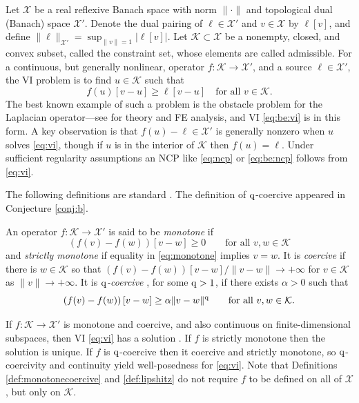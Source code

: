 \documentclass[hidelinks,onefignum,onetabnum,final]{siamart220329}  %
\newcommand{\cK}{\mathcal{K}}
\newcommand{\cX}{\mathcal{X}}
\newcommand{\qq}{{\text{\textnormal{q}}}}
\begin{document}
Let $\cX$ be a real reflexive Banach space with norm $\|\cdot\|$ and topological dual (Banach) space $\cX'$.  Denote the dual pairing of $\ell \in \cX'$ and $v\in\cX$ by $\ell[v]$, and define $\|\ell\|_{\cX'} = \sup_{\|v\|=1} \big|\ell[v]\big|$.  Let $\cK \subset \cX$ be a nonempty, closed, and convex subset, called the constraint set, whose elements are called admissible.  For a continuous, but generally nonlinear, operator $f:\cK \to \cX'$, and a source $\ell\in \cX'$, the VI problem is to find $u\in \cK$ such that
\begin{equation}
f(u)[v-u] \ge \ell[v-u] \quad \text{for all } v\in \cK. \label{eq:vi}
\end{equation}
The best known example of such a problem is the obstacle problem for the Laplacian operator---see \cite{Ciarlet2002,Evans2010,KinderlehrerStampacchia1980} for theory and FE analysis, and VI \eqref{eq:be:vi} is in this form.  A key observation is that $f(u)-\ell \in \cX'$ is generally nonzero when $u$ solves \eqref{eq:vi}, though if $u$ is in the interior of $\cK$ then $f(u)=\ell$.  Under sufficient regularity assumptions an NCP like \eqref{eq:ncp} or \eqref{eq:be:ncp} follows from \eqref{eq:vi}.

The following definitions are standard \cite[Chapter III]{KinderlehrerStampacchia1980}.  The definition of $\qq$-coercive appeared in Conjecture \ref{conj:b}.

\begin{definition} \label{def:monotonecoercive}
An operator $f:\cK \to \cX'$ is said to be \emph{monotone} if
\begin{equation}
\left(f(v)-f(w)\right)[v-w] \ge 0 \qquad \text{for all } v,w \in \cK \label{eq:monotone}
\end{equation}
and \emph{strictly monotone} if equality in \eqref{eq:monotone} implies $v=w$.  It is \emph{coercive} if there is $w\in \cK$ so that $\left(f(v)-f(w)\right)[v-w]/\|v-w\| \to +\infty$ for $v \in \cK$ as $\|v\| \to +\infty$.  It is \emph{$\qq$-coercive} \cite{Bueler2021conservation}, for some $\qq>1$, if there exists $\alpha>0$ such that
\begin{equation}
\left(f(v)-f(w)\right)[v-w] \ge \alpha \|v-w\|^\qq \qquad \text{for all } v,w \in \cK. \label{eq:qcoercive}
\end{equation}
\end{definition}

If $f:\cK \to \cX'$ is monotone and coercive, and also continuous on finite-dimensional subspaces, then VI \eqref{eq:vi} has a solution \cite[Corollary III.1.8]{KinderlehrerStampacchia1980}.  If $f$ is strictly monotone then the solution is unique.  If $f$ is $\qq$-coercive then it coercive and strictly monotone, so $\qq$-coercivity and continuity yield well-posedness for \eqref{eq:vi}.  Note that Definitions \ref{def:monotonecoercive} and \ref{def:lipshitz} do not require $f$ to be defined on all of $\cX$, but only on $\cK$.  
  
\end{document}
